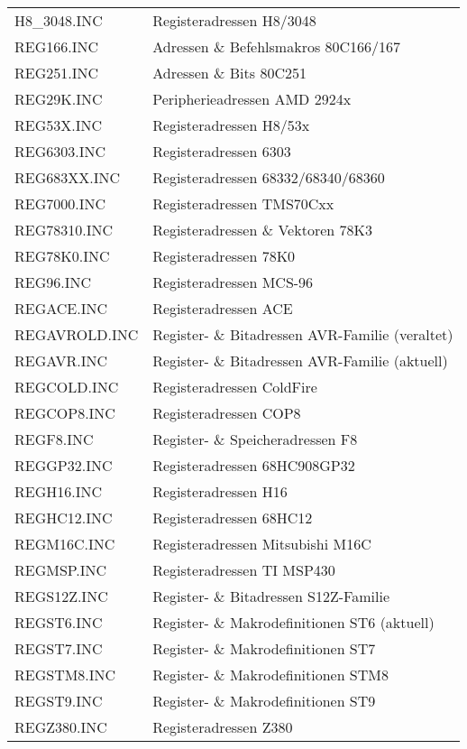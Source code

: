 \documentclass[12pt,a4paper,twoside]{report}
\begin{document}
\begin{center}
\begin{longtable}{|l|l|}
H8\_3048.INC      & Registeradressen H8/3048 \\
REG166.INC        & Adressen \& Befehlsmakros 80C166/167 \\
REG251.INC        & Adressen \& Bits 80C251 \\
REG29K.INC        & Peripherieadressen AMD 2924x \\
REG53X.INC        & Registeradressen H8/53x \\
REG6303.INC       & Registeradressen 6303 \\
REG683XX.INC      & Registeradressen 68332/68340/68360 \\
REG7000.INC       & Registeradressen TMS70Cxx \\
REG78310.INC      & Registeradressen \& Vektoren 78K3 \\
REG78K0.INC       & Registeradressen 78K0 \\
REG96.INC         & Registeradressen MCS-96 \\
REGACE.INC        & Registeradressen ACE \\
REGAVROLD.INC     & Register- \& Bitadressen AVR-Familie (veraltet)\\
REGAVR.INC        & Register- \& Bitadressen AVR-Familie (aktuell)\\
REGCOLD.INC       & Registeradressen ColdFire \\
REGCOP8.INC       & Registeradressen COP8 \\
REGF8.INC         & Register- \& Speicheradressen F8 \\
REGGP32.INC       & Registeradressen 68HC908GP32 \\
REGH16.INC        & Registeradressen H16 \\
REGHC12.INC       & Registeradressen 68HC12 \\
REGM16C.INC       & Registeradressen Mitsubishi M16C \\
REGMSP.INC        & Registeradressen TI MSP430 \\
REGS12Z.INC       & Register- \& Bitadressen S12Z-Familie \\
REGST6.INC        & Register- \& Makrodefinitionen ST6 (aktuell)\\
REGST7.INC        & Register- \& Makrodefinitionen ST7 \\
REGSTM8.INC       & Register- \& Makrodefinitionen STM8 \\
REGST9.INC        & Register- \& Makrodefinitionen ST9 \\
REGZ380.INC       & Registeradressen Z380 \\

\end{longtable}
\end{center}
\end{document}
